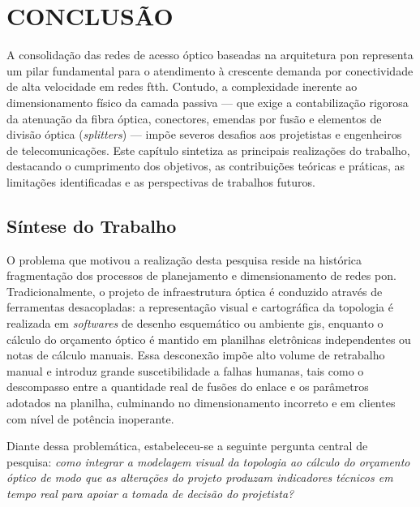 \chapter{CONCLUSÃO}

A consolidação das redes de acesso óptico baseadas na arquitetura \gls{pon} representa um pilar fundamental para o atendimento à crescente demanda por conectividade de alta velocidade em redes \gls{ftth}. Contudo, a complexidade inerente ao dimensionamento físico da camada passiva — que exige a contabilização rigorosa da atenuação da fibra óptica, conectores, emendas por fusão e elementos de divisão óptica (\textit{splitters}) — impõe severos desafios aos projetistas e engenheiros de telecomunicações. Este capítulo sintetiza as principais realizações do trabalho, destacando o cumprimento dos objetivos, as contribuições teóricas e práticas, as limitações identificadas e as perspectivas de trabalhos futuros.

\section{Síntese do Trabalho}

O problema que motivou a realização desta pesquisa reside na histórica fragmentação dos processos de planejamento e dimensionamento de redes \gls{pon}. Tradicionalmente, o projeto de infraestrutura óptica é conduzido através de ferramentas desacopladas: a representação visual e cartográfica da topologia é realizada em \textit{softwares} de desenho esquemático ou ambiente \gls{gis}, enquanto o cálculo do orçamento óptico é mantido em planilhas eletrônicas independentes ou notas de cálculo manuais. Essa desconexão impõe alto volume de retrabalho manual e introduz grande suscetibilidade a falhas humanas, tais como o descompasso entre a quantidade real de fusões do enlace e os parâmetros adotados na planilha, culminando no dimensionamento incorreto e em clientes com nível de potência inoperante.

Diante dessa problemática, estabeleceu-se a seguinte pergunta central de pesquisa: \textit{como integrar a modelagem visual da topologia ao cálculo do orçamento óptico de modo que as alterações do projeto produzam indicadores técnicos em tempo real para apoiar a tomada de decisão do projetista?}

